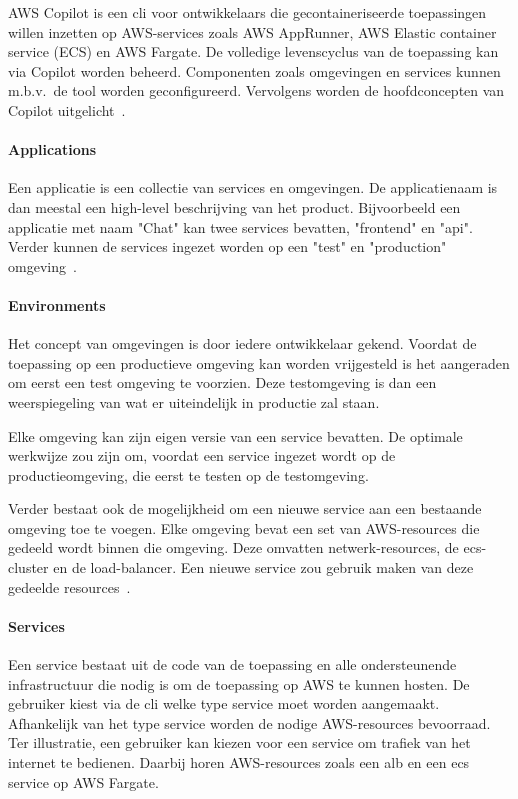 AWS Copilot is een \acrfull{cli} voor ontwikkelaars die gecontaineriseerde toepassingen willen inzetten op AWS-services zoals AWS AppRunner, AWS Elastic container service (ECS) en AWS Fargate.
De volledige levenscyclus van de toepassing kan via Copilot worden beheerd.
Componenten zoals omgevingen en services kunnen m.b.v.\ de tool worden geconfigureerd.
Vervolgens worden de hoofdconcepten van Copilot uitgelicht~\autocite{Karakus2022}.

\paragraph{Applications}

Een applicatie is een collectie van services en omgevingen.
De applicatienaam is dan meestal een high-level beschrijving van het product.
Bijvoorbeeld een applicatie met naam "Chat" kan twee services bevatten, "frontend" en "api".
Verder kunnen de services ingezet worden op een "test" en "production" omgeving~\autocite{Karakus2022}.

\paragraph{Environments}

Het concept van omgevingen is door iedere ontwikkelaar gekend.
Voordat de toepassing op een productieve omgeving kan worden vrijgesteld is het aangeraden om eerst een test omgeving te voorzien.
Deze testomgeving is dan een weerspiegeling van wat er uiteindelijk in productie zal staan.

Elke omgeving kan zijn eigen versie van een service bevatten.
De optimale werkwijze zou zijn om, voordat een service ingezet wordt op de productieomgeving, die eerst te testen op de testomgeving.

Verder bestaat ook de mogelijkheid om een nieuwe service aan een bestaande omgeving toe te voegen.
Elke omgeving bevat een set van AWS-resources die gedeeld wordt binnen die omgeving.
Deze omvatten netwerk-resources, de \acrshort{ecs}-cluster en de load-balancer.
Een nieuwe service zou gebruik maken van deze gedeelde resources~\autocite{Karakus2022}.

\paragraph{Services}

Een service bestaat uit de code van de toepassing en alle ondersteunende infrastructuur die nodig is om de toepassing op AWS te kunnen hosten.
De gebruiker kiest via de \acrshort{cli} welke type service moet worden aangemaakt.
Afhankelijk van het type service worden de nodige AWS-resources bevoorraad.
Ter illustratie, een gebruiker kan kiezen voor een service om trafiek van het internet te bedienen.
Daarbij horen AWS-resources zoals een \acrfull{alb} en een \acrshort{ecs} service op AWS Fargate.

